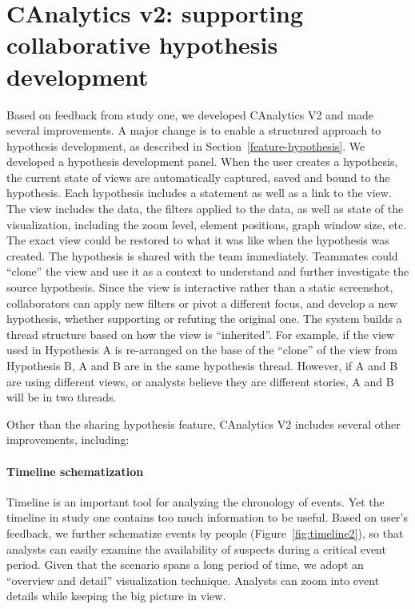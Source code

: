 \section{CAnalytics v2: supporting collaborative hypothesis development}

Based on feedback from study one, we developed CAnalytics V2 and made several improvements. A major change is to enable a structured approach to hypothesis development, as described in Section~\ref{feature-hypothesis}. We developed a hypothesis development panel. When the user creates a hypothesis,
the current state of views are automatically captured, saved and bound to
the hypothesis. Each hypothesis includes a statement as well as a link to the view.
The view includes the data, the filters applied to the data, as well as state of
the visualization, including the zoom level, element positions, graph window size, etc. The exact view could be restored to what it was like when the
hypothesis was created. The hypothesis is shared with the team immediately.
Teammates could ``clone'' the view and use it as a context to understand and further investigate the source hypothesis. Since the view is interactive rather than a static screenshot, collaborators can apply new filters or pivot a different focus, and develop a new hypothesis,
whether supporting or refuting the original one. The system builds a thread structure based
on how the view is ``inherited''. For example, if the view used in
Hypothesis A is re-arranged on the base of the ``clone'' of the view from Hypothesis B, A and B
are in the same hypothesis thread. However, if A and B are using different
views, or analysts believe they are different stories, A and B will be in two
threads.

Other than the sharing hypothesis feature, CAnalytics V2 includes several other improvements, including:

\paragraph{Timeline schematization}
Timeline is an important tool for analyzing the chronology of events. Yet the timeline in study one contains too much information to be useful. Based on user's feedback, we further schematize events by people (Figure~\ref{fig:timeline2}), so that analysts can easily examine the availability of suspects during a critical event period. Given that the scenario spans a long period of time, we adopt an ``overview and detail'' visualization technique. Analysts can zoom into event details while keeping the big picture in view. 

